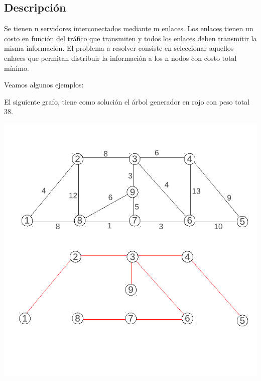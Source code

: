 \subsection{Descripción}
Se tienen n servidores interconectados mediante m enlaces. Los enlaces tienen un costo en función del tráfico que transmiten y todos los enlaces deben transmitir la misma información. El problema a resolver consiste en seleccionar aquellos enlaces que permitan distribuir la información a los n nodos con costo total mínimo.


Veamos algunos ejemplos:


El siguiente grafo, tiene como solución el árbol generador en rojo con peso total 38.

\begin{center}
\includegraphics{ej2/1/Img1.pdf} 
\end{center}

